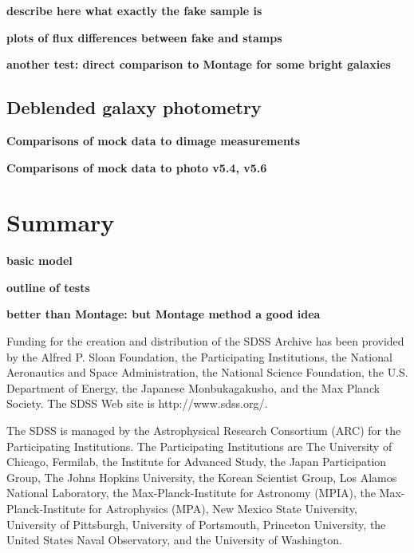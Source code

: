\documentclass[10pt,preprint]{aastex}
\begin{document}
{\bf describe here what exactly the fake sample is}

{\bf plots of flux differences between fake and stamps}

{\bf another test: direct comparison to Montage for some bright
galaxies}

\subsection{ Deblended galaxy photometry}
\label{sec:deblendgal}

{\bf Comparisons of mock data to dimage measurements}

{\bf Comparisons of mock data to photo v5.4, v5.6}

\section{ Summary}

{\bf basic model}

{\bf outline of tests}

{\bf better than Montage: but Montage method a good idea}

\acknowledgments

Funding for the creation and distribution of the SDSS Archive has been
provided by the Alfred P. Sloan Foundation, the Participating
Institutions, the National Aeronautics and Space Administration, the
National Science Foundation, the U.S. Department of Energy, the
Japanese Monbukagakusho, and the Max Planck Society. The SDSS Web site
is http://www.sdss.org/.

The SDSS is managed by the Astrophysical Research Consortium (ARC) for
the Participating Institutions. The Participating Institutions are The
University of Chicago, Fermilab, the Institute for Advanced Study, the
Japan Participation Group, The Johns Hopkins University, the Korean
Scientist Group, Los Alamos National Laboratory, the
Max-Planck-Institute for Astronomy (MPIA), the Max-Planck-Institute
for Astrophysics (MPA), New Mexico State University, University of
Pittsburgh, University of Portsmouth, Princeton University, the United
States Naval Observatory, and the University of Washington.




\newpage


%
\end{document}
